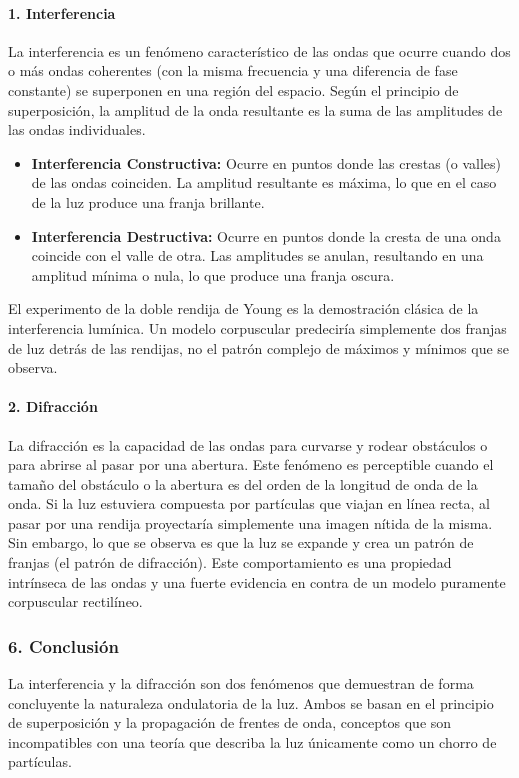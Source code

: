 \paragraph{1. Interferencia}
La interferencia es un fenómeno característico de las ondas que ocurre cuando dos o más ondas coherentes (con la misma frecuencia y una diferencia de fase constante) se superponen en una región del espacio. Según el principio de superposición, la amplitud de la onda resultante es la suma de las amplitudes de las ondas individuales.
\begin{itemize}
    \item \textbf{Interferencia Constructiva:} Ocurre en puntos donde las crestas (o valles) de las ondas coinciden. La amplitud resultante es máxima, lo que en el caso de la luz produce una franja brillante.
    \item \textbf{Interferencia Destructiva:} Ocurre en puntos donde la cresta de una onda coincide con el valle de otra. Las amplitudes se anulan, resultando en una amplitud mínima o nula, lo que produce una franja oscura.
\end{itemize}
El experimento de la doble rendija de Young es la demostración clásica de la interferencia lumínica. Un modelo corpuscular predeciría simplemente dos franjas de luz detrás de las rendijas, no el patrón complejo de máximos y mínimos que se observa.

\paragraph{2. Difracción}
La difracción es la capacidad de las ondas para curvarse y rodear obstáculos o para abrirse al pasar por una abertura. Este fenómeno es perceptible cuando el tamaño del obstáculo o la abertura es del orden de la longitud de onda de la onda. Si la luz estuviera compuesta por partículas que viajan en línea recta, al pasar por una rendija proyectaría simplemente una imagen nítida de la misma. Sin embargo, lo que se observa es que la luz se expande y crea un patrón de franjas (el patrón de difracción). Este comportamiento es una propiedad intrínseca de las ondas y una fuerte evidencia en contra de un modelo puramente corpuscular rectilíneo.

\subsubsection*{6. Conclusión}
\begin{cajaconclusion}
La interferencia y la difracción son dos fenómenos que demuestran de forma concluyente la naturaleza ondulatoria de la luz. Ambos se basan en el principio de superposición y la propagación de frentes de onda, conceptos que son incompatibles con una teoría que describa la luz únicamente como un chorro de partículas.
\end{cajaconclusion}

